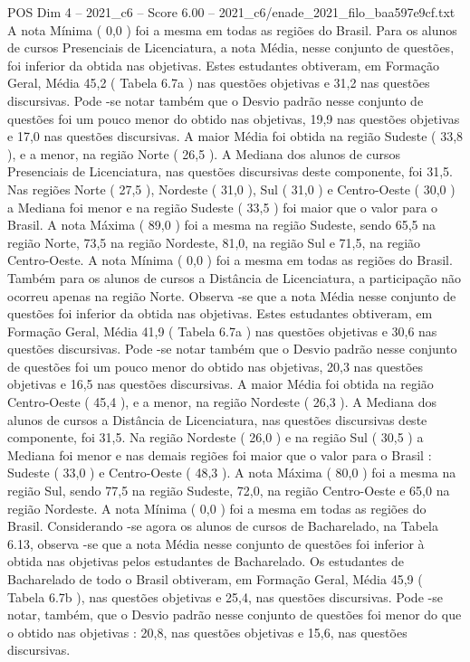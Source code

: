 \begin{textsample}{POS Dim 4 – 2021\_c6 – Score 6.00 – 2021\_c6/enade\_2021\_filo\_baa597e9cf.txt}
A nota Mínima ( 0,0 ) foi a mesma em todas as regiões do Brasil.
Para os alunos de cursos Presenciais de Licenciatura, a nota Média, nesse conjunto de questões, foi inferior da obtida nas objetivas.
Estes estudantes obtiveram, em Formação Geral, Média 45,2 ( Tabela 6.7a ) nas questões objetivas e 31,2 nas questões discursivas.
Pode -se notar também que o Desvio padrão nesse conjunto de questões foi um pouco menor do obtido nas objetivas, 19,9 nas questões objetivas e 17,0 nas questões discursivas.
A maior Média foi obtida na região Sudeste ( 33,8 ), e a menor, na região Norte ( 26,5 ).
A Mediana dos alunos de cursos Presenciais de Licenciatura, nas questões discursivas deste componente, foi 31,5.
Nas regiões Norte ( 27,5 ), Nordeste ( 31,0 ), Sul ( 31,0 ) e Centro-Oeste ( 30,0 ) a Mediana foi menor e na região Sudeste ( 33,5 ) foi maior que o valor para o Brasil.
A nota Máxima ( 89,0 ) foi a mesma na região Sudeste, sendo 65,5 na região Norte, 73,5 na região Nordeste, 81,0, na região Sul e 71,5, na região Centro-Oeste.
A nota Mínima ( 0,0 ) foi a mesma em todas as regiões do Brasil.
Também para os alunos de cursos a Distância de Licenciatura, a participação não ocorreu apenas na região Norte.
Observa -se que a nota Média nesse conjunto de questões foi inferior da obtida nas objetivas.
Estes estudantes obtiveram, em Formação Geral, Média 41,9 ( Tabela 6.7a ) nas questões objetivas e 30,6 nas questões discursivas.
Pode -se notar também que o Desvio padrão nesse conjunto de questões foi um pouco menor do obtido nas objetivas, 20,3 nas questões objetivas e 16,5 nas questões discursivas.
A maior Média foi obtida na região Centro-Oeste ( 45,4 ), e a menor, na região Nordeste ( 26,3 ).
A Mediana dos alunos de cursos a Distância de Licenciatura, nas questões discursivas deste componente, foi 31,5.
Na região Nordeste ( 26,0 ) e na região Sul ( 30,5 ) a Mediana foi menor e nas demais regiões foi maior que o valor para o Brasil : Sudeste ( 33,0 ) e Centro-Oeste ( 48,3 ).
A nota Máxima ( 80,0 ) foi a mesma na região Sul, sendo 77,5 na região Sudeste, 72,0, na região Centro-Oeste e 65,0 na região Nordeste.
A nota Mínima ( 0,0 ) foi a mesma em todas as regiões do Brasil.
Considerando -se agora os alunos de cursos de Bacharelado, na Tabela 6.13, observa -se que a nota Média nesse conjunto de questões foi inferior à obtida nas objetivas pelos estudantes de Bacharelado.
Os estudantes de Bacharelado de todo o Brasil obtiveram, em Formação Geral, Média 45,9 ( Tabela 6.7b ), nas questões objetivas e 25,4, nas questões discursivas.
Pode -se notar, também, que o Desvio padrão nesse conjunto de questões foi menor do que o obtido nas objetivas : 20,8, nas questões objetivas e 15,6, nas questões discursivas.

\end{textsample}
